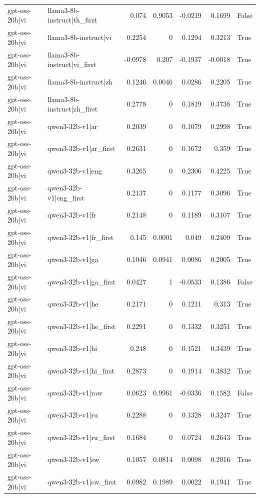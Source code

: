 \begin{table}
\begin{tabular}{l l r r r r l}
gpt-oss-20b|vi & llama3-8b-instruct|th_first & 0.074 & 0.9053 & -0.0219 & 0.1699 & False \\
gpt-oss-20b|vi & llama3-8b-instruct|vi & 0.2254 & 0 & 0.1294 & 0.3213 & True \\
gpt-oss-20b|vi & llama3-8b-instruct|vi_first & -0.0978 & 0.207 & -0.1937 & -0.0018 & True \\
gpt-oss-20b|vi & llama3-8b-instruct|zh & 0.1246 & 0.0046 & 0.0286 & 0.2205 & True \\
gpt-oss-20b|vi & llama3-8b-instruct|zh_first & 0.2778 & 0 & 0.1819 & 0.3738 & True \\
gpt-oss-20b|vi & qwen3-32b-v1|ar & 0.2039 & 0 & 0.1079 & 0.2998 & True \\
gpt-oss-20b|vi & qwen3-32b-v1|ar_first & 0.2631 & 0 & 0.1672 & 0.359 & True \\
gpt-oss-20b|vi & qwen3-32b-v1|eng & 0.3265 & 0 & 0.2306 & 0.4225 & True \\
gpt-oss-20b|vi & qwen3-32b-v1|eng_first & 0.2137 & 0 & 0.1177 & 0.3096 & True \\
gpt-oss-20b|vi & qwen3-32b-v1|fr & 0.2148 & 0 & 0.1189 & 0.3107 & True \\
gpt-oss-20b|vi & qwen3-32b-v1|fr_first & 0.145 & 0.0001 & 0.049 & 0.2409 & True \\
gpt-oss-20b|vi & qwen3-32b-v1|ga & 0.1046 & 0.0941 & 0.0086 & 0.2005 & True \\
gpt-oss-20b|vi & qwen3-32b-v1|ga_first & 0.0427 & 1 & -0.0533 & 0.1386 & False \\
gpt-oss-20b|vi & qwen3-32b-v1|he & 0.2171 & 0 & 0.1211 & 0.313 & True \\
gpt-oss-20b|vi & qwen3-32b-v1|he_first & 0.2291 & 0 & 0.1332 & 0.3251 & True \\
gpt-oss-20b|vi & qwen3-32b-v1|hi & 0.248 & 0 & 0.1521 & 0.3439 & True \\
gpt-oss-20b|vi & qwen3-32b-v1|hi_first & 0.2873 & 0 & 0.1914 & 0.3832 & True \\
gpt-oss-20b|vi & qwen3-32b-v1|raw & 0.0623 & 0.9961 & -0.0336 & 0.1582 & False \\
gpt-oss-20b|vi & qwen3-32b-v1|ru & 0.2288 & 0 & 0.1328 & 0.3247 & True \\
gpt-oss-20b|vi & qwen3-32b-v1|ru_first & 0.1684 & 0 & 0.0724 & 0.2643 & True \\
gpt-oss-20b|vi & qwen3-32b-v1|sw & 0.1057 & 0.0814 & 0.0098 & 0.2016 & True \\
gpt-oss-20b|vi & qwen3-32b-v1|sw_first & 0.0982 & 0.1989 & 0.0022 & 0.1941 & True \\

\end{tabular}
\end{table}
